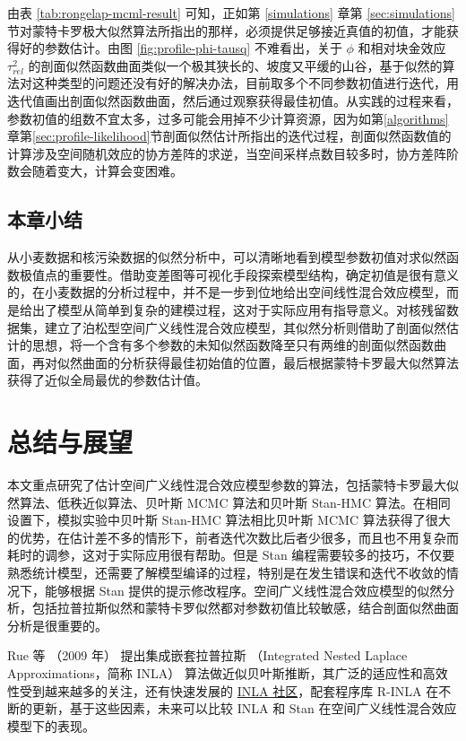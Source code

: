 \documentclass[12pt,a4paper,UTF8,twoside]{book}
\theoremstyle{definition}
\theoremstyle{definition}
\theoremstyle{definition}
\theoremstyle{remark}
\begin{document}
由表 \ref{tab:rongelap-mcml-result} 可知，正如第 \ref{simulations} 章第 \ref{sec:simulations} 节对蒙特卡罗极大似然算法所指出的那样，必须提供足够接近真值的初值，才能获得好的参数估计。由图 \ref{fig:profile-phi-tausq} 不难看出，关于 \(\phi\) 和相对块金效应 \(\tau^2_{rel}\) 的剖面似然函数曲面类似一个极其狭长的、坡度又平缓的山谷，基于似然的算法对这种类型的问题还没有好的解决办法，目前取多个不同参数初值进行迭代，用迭代值画出剖面似然函数曲面，然后通过观察获得最佳初值。从实践的过程来看，参数初值的组数不宜太多，过多可能会用掉不少计算资源，因为如第\ref{algorithms}章第\ref{sec:profile-likelihood}节剖面似然估计所指出的迭代过程，剖面似然函数值的计算涉及空间随机效应的协方差阵的求逆，当空间采样点数目较多时，协方差阵阶数会随着变大，计算会变困难。



\hypertarget{sec:cases}{%
\section{本章小结}\label{sec:cases}}

从小麦数据和核污染数据的似然分析中，可以清晰地看到模型参数初值对求似然函数极值点的重要性。借助变差图等可视化手段探索模型结构，确定初值是很有意义的，在小麦数据的分析过程中，并不是一步到位地给出空间线性混合效应模型，而是给出了模型从简单到复杂的建模过程，这对于实际应用有指导意义。对核残留数据集，建立了泊松型空间广义线性混合效应模型，其似然分析则借助了剖面似然估计的思想，将一个含有多个参数的未知似然函数降至只有两维的剖面似然函数曲面，再对似然曲面的分析获得最佳初始值的位置，最后根据蒙特卡罗最大似然算法获得了近似全局最优的参数估计值。

\hypertarget{summary}{%
\chapter{总结与展望}\label{summary}}

本文重点研究了估计空间广义线性混合效应模型参数的算法，包括蒙特卡罗最大似然算法、低秩近似算法、贝叶斯 MCMC 算法和贝叶斯 Stan-HMC 算法。在相同设置下，模拟实验中贝叶斯 Stan-HMC 算法相比贝叶斯 MCMC 算法获得了很大的优势，在估计差不多的情形下，前者迭代次数比后者少很多，而且也不用复杂而耗时的调参，这对于实际应用很有帮助。但是 Stan 编程需要较多的技巧，不仅要熟悉统计模型，还需要了解模型编译的过程，特别是在发生错误和迭代不收敛的情况下，能够根据 Stan 提供的提示修改程序。空间广义线性混合效应模型的似然分析，包括拉普拉斯似然和蒙特卡罗似然都对参数初值比较敏感，结合剖面似然曲面分析是很重要的。

Rue 等 （2009 年） \citep{Rue2009} 提出集成嵌套拉普拉斯 （Integrated Nested Laplace Approximations，简称 INLA） 算法做近似贝叶斯推断，其广泛的适应性和高效性受到越来越多的关注，还有快速发展的 \href{http://www.r-inla.org/}{INLA 社区}，配套程序库 R-INLA 在不断的更新，基于这些因素，未来可以比较 INLA 和 Stan 在空间广义线性混合效应模型下的表现。
\end{document}
